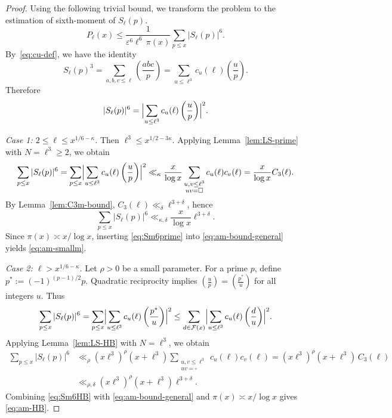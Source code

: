 \documentclass[11pt,letterpaper,reqno]{amsart}
\theoremstyle{definition}
\numberwithin{equation}{section}
\newcommand{\eps}{\varepsilon}
\newcommand{\Leg}[2]{\left(\frac{#1}{#2}\right)}
\newcommand{\1}{\mathbf{1}}
\begin{document}
\begin{proof}

Using the following trivial bound, we transform the problem to the estimation of sixth-moment of $S_{\ell}(p)$.
\begin{equation}\label{eq:am-bound-general}
P_{\ell}(x)\le \frac{1}{\eps^6 {\ell}^6\,\pi(x)}\sum_{p\le x} |S_{\ell}(p)|^6.
\end{equation}By~\eqref{eq:cu-def}, we have the identity
\[
S_{\ell}(p)^3=\sum_{a,b,c\le {\ell}}\Leg{abc}{p}
=\sum_{u\le {\ell}^3} c_u(\ell) \Leg{u}{p}.
\]
Therefore
\begin{equation}\label{eq:Sm6-as-quadratic}
|S_{\ell}(p)|^6=\Bigl|\sum_{u\le {\ell}^3} c_u(\ell) \Leg{u}{p}\Bigr|^2.
\end{equation}

\smallskip
\noindent\emph{Case 1: $2 \leq {\ell}\le x^{1/6-\kappa}$.}
Then ${\ell}^3\le x^{1/2-3\kappa}$. Applying Lemma~\ref{lem:LS-prime} with $N={\ell}^3 \geq 2$, we obtain
\[
\sum_{p\le x} |S_{\ell}(p)|^6
=\sum_{p\le x}\Bigl|\sum_{u\le {\ell}^3} c_u(\ell) \Leg{u}{p}\Bigr|^2
\ll_\kappa \frac{x}{\log x}\sum_{\substack{u,v\le {\ell}^3\\ uv=\square}} c_u(\ell) c_v(\ell)
=\frac{x}{\log x} C_3({\ell}).
\]
By Lemma~\ref{lem:C3m-bound}, $C_3({\ell})\ll_\delta {\ell}^{3+\delta}$, hence
\begin{equation}\label{eq:Sm6prime}
\sum_{p\le x}|S_{\ell}(p)|^6\ll_{\kappa,\delta}\frac{x}{\log x} {\ell}^{3+\delta}.
\end{equation}
Since $\pi(x)\asymp x/\log x$, inserting \eqref{eq:Sm6prime} into \eqref{eq:am-bound-general} yields
\eqref{eq:am-smallm}.

\smallskip
\noindent\emph{Case 2: ${\ell}>x^{1/6-\kappa}$.}
Let $\rho>0$ be a small parameter. For a prime $p$, define $p^\ast:=(-1)^{(p-1)/2}p$.
Quadratic reciprocity implies $\Leg{u}{p}=\Leg{p^\ast}{u}$ for all integers $u$.
Thus
\[
\sum_{p\le x}|S_{\ell}(p)|^6
=\sum_{p\le x}\Bigl|\sum_{u\le {\ell}^3} c_u(\ell) \Leg{p^\ast}{u}\Bigr|^2
\le \sum_{d\in\mathcal{F}(x)}\Bigl|\sum_{u\le {\ell}^3} c_u(\ell) \Leg{d}{u}\Bigr|^2.
\]
Applying Lemma~\ref{lem:LS-HB} with $N={\ell}^3$, we obtain
\begin{align}
\sum_{p\le x}|S_{\ell}(p)|^6
&\ll_\rho (x {\ell}^3)^\rho (x+{\ell}^3)\sum_{\substack{u,v\le {\ell}^3\\ uv=\square}} c_u(\ell) c_v(\ell)
=(x {\ell}^3)^\rho (x+{\ell}^3)\,C_3({\ell})\nonumber\\
&\ll_{\rho,\delta} (x {\ell}^3)^\rho (x+{\ell}^3) {\ell}^{3+\delta}.
\label{eq:Sm6HB}
\end{align}
Combining \eqref{eq:Sm6HB} with \eqref{eq:am-bound-general} and $\pi(x)\asymp x/\log x$ gives \eqref{eq:am-HB}.
\end{proof}
\end{document}
